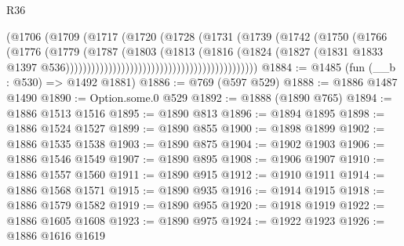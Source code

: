 \begin{lexlean}{R36}
\begin{coremodule}
                                                        (@1706
                                                          (@1709
                                                            (@1717
                                                              (@1720
                                                                (@1728
                                                                  (@1731
                                                                    (@1739
                                                                      (@1742
                                                                        (@1750
                                                                          (@1766
                                                                            (@1776
                                                                              (@1779
                                                                                (@1787
                                                                                  (@1803
                                                                                    (@1813
                                                                                      (@1816
                                                                                        (@1824
                                                                                          (@1827
                                                                                            (@1831
                                                                                              @1833
                                                                                              @1397
                                                                                              @536)))))))))))))))))))))))))))))))))))))))))))))
@1884 := @1485 (fun (__b : @530) => @1492 @1881)
@1886 := @769 (@597 @529)
@1888 := @1886 @1487 @1490
@1890 := Option.some.{0} @529
@1892 := @1888 (@1890 @765)
@1894 := @1886 @1513 @1516
@1895 := @1890 @813
@1896 := @1894 @1895
@1898 := @1886 @1524 @1527
@1899 := @1890 @855
@1900 := @1898 @1899
@1902 := @1886 @1535 @1538
@1903 := @1890 @875
@1904 := @1902 @1903
@1906 := @1886 @1546 @1549
@1907 := @1890 @895
@1908 := @1906 @1907
@1910 := @1886 @1557 @1560
@1911 := @1890 @915
@1912 := @1910 @1911
@1914 := @1886 @1568 @1571
@1915 := @1890 @935
@1916 := @1914 @1915
@1918 := @1886 @1579 @1582
@1919 := @1890 @955
@1920 := @1918 @1919
@1922 := @1886 @1605 @1608
@1923 := @1890 @975
@1924 := @1922 @1923
@1926 := @1886 @1616 @1619

\end{coremodule}
\end{lexlean}
